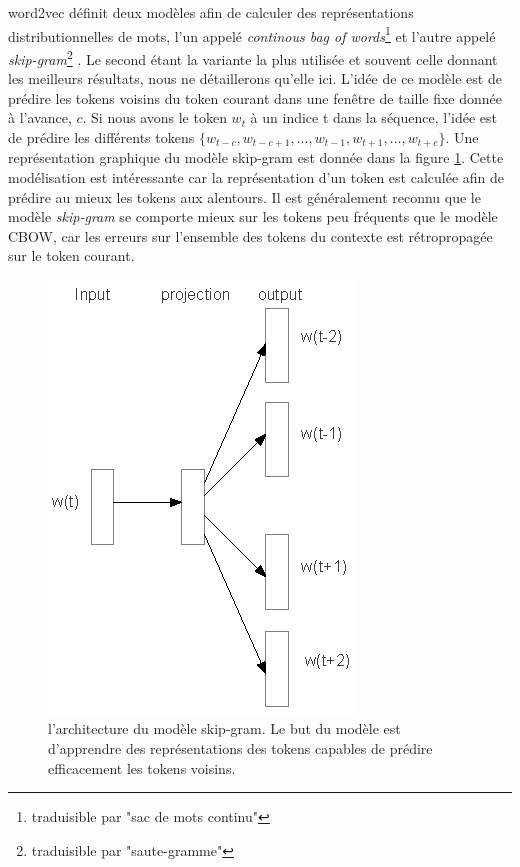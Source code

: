 \documentclass[12pt,a4paper,times,twoside,openright]{report}
\begin{document}
word2vec définit deux modèles afin de calculer des représentations distributionnelles de mots, l'un appelé \textit{continous bag of words}\footnote{traduisible par "sac de mots continu"} et l'autre appelé \textit{skip-gram}\footnote{traduisible par "saute-gramme"} \citep{mikolov2013efficient}. Le second étant la variante la plus utilisée et souvent celle donnant les meilleurs résultats, nous ne détaillerons qu'elle ici. L'idée de ce modèle est de prédire les tokens voisins du token courant dans une fenêtre de taille fixe donnée à l'avance, $c$. Si nous avons le token $w_{t}$ à un indice t dans la séquence, l'idée est de prédire les différents tokens $\{w_{t-c},w_{t-c+1},...,w_{t-1},w_{t+1},...,w_{t+c}\}$. Une représentation graphique du modèle skip-gram est donnée dans la figure \ref{fig:skipgram}. Cette modélisation est intéressante car la représentation d'un token est calculée afin de prédire au mieux les tokens aux alentours. Il est généralement reconnu que le modèle \textit{skip-gram} se comporte mieux sur les tokens peu fréquents que le modèle CBOW, car les erreurs sur l'ensemble des tokens du contexte est rétropropagée sur le token courant.

\begin{figure}[ht!]
    \centering
    \includegraphics[scale=1.2]{images/NN/word2vec/skipgram}
    \caption{l'architecture du modèle skip-gram. Le but du modèle est d'apprendre des représentations des tokens capables de prédire efficacement les tokens voisins.}
    \label{fig:skipgram}
\end{figure}
\end{document}

